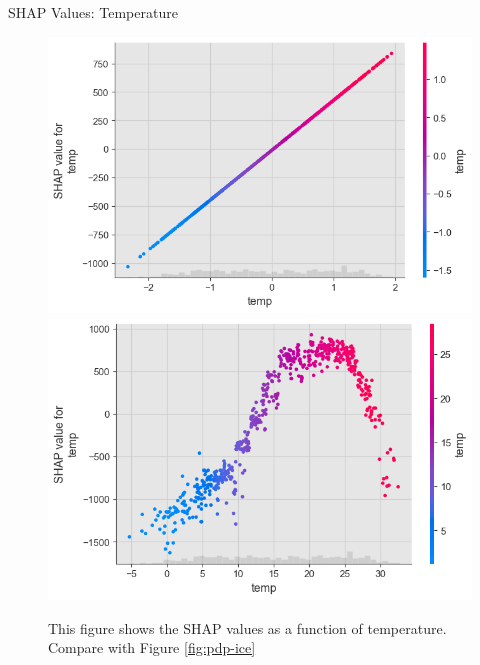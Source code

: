 \documentclass[10pt]{beamer}
\begin{document}
\begin{frame}{SHAP Values: Temperature}
\begin{center}
  \begin{figure}
    \includegraphics[scale=0.3]{images/interpretable_ml_127_0.png}
    \includegraphics[scale=0.3]{images/interpretable_ml_141_0.png}
    \caption{This figure shows the SHAP values as a function of temperature. Compare with Figure \ref{fig:pdp-ice}}
  \end{figure}
\end{center}
\end{frame}
\end{document}

